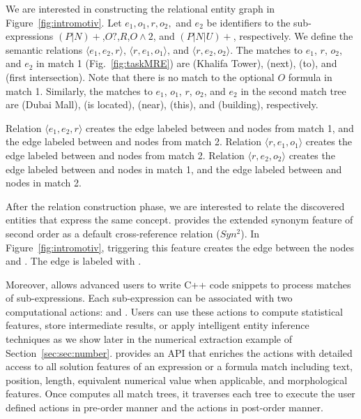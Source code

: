 We are interested in constructing the relational entity graph in Figure~\ref{fig:intromotiv}.
Let $e_1,o_1,r,o_2,$ and $e_2$ be identifiers to the sub-expressions 
$(P|N)+$,$O?$,$R$,$O\wedge 2$, and $(P|N|U)+$, respectively.
We define the semantic relations $\langle e_1, e_2, r\rangle$, $\langle r, e_1, o_1\rangle$, and $\langle r,e_2,o_2\rangle$.
The matches to $e_1$, $r$, $o_2$, and $e_2$ in match 1 (Fig.~\ref{fig:taskMRE}) are  (Khalifa Tower),  (next),  (to), and  (first intersection).
Note that there is no match to the optional $O$ formula in match 1.
Similarly, the matches to $e_1$, $o_1$, $r$, $o_2$, and $e_2$ in the second match tree are
 (Dubai Mall),  (is located),  (near),  (this), and  (building), respectively.

Relation $\langle e_1,e_2,r\rangle$ creates the 
edge labeled  between  and 
 nodes from match 1, and the 
edge labeled  between  and  nodes from match 2.
Relation $\langle r,e_1,o_1\rangle$ creates the edge labeled  
between  and  nodes from match 2. 
Relation $\langle r,e_2,o_2\rangle$ creates the edge labeled  
between  and  nodes in 
match 1, and the 
edge labeled  between  and  
nodes in match 2.

After the relation construction phase, we are interested to relate the discovered entities
that express the same concept.
\framework provides the extended synonym feature of second order as a default cross-reference relation ($Syn^2$).
In Figure~\ref{fig:intromotiv}, triggering this feature creates the edge between the nodes  and .
The edge is labeled with .

Moreover, \framework allows advanced users to write C++ code snippets 
to process matches of sub-expressions.
Each sub-expression can be associated with two computational actions:  and .
Users can use these actions to compute statistical features, 
store intermediate results, 
or apply intelligent entity inference techniques
as we show later in the numerical extraction example of Section~\ref{sec:sec:number}.
\framework provides an API that enriches the actions with detailed access to
all solution features of an expression or a formula match including 
text, position, length, equivalent numerical value when applicable, 
and morphological features.
Once \framework computes all match trees, it traverses each tree to 
execute the user defined  actions in pre-order manner
and the  actions in post-order manner.

